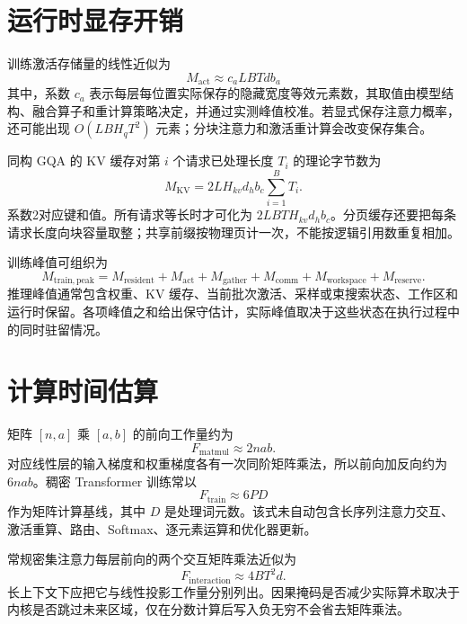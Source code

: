 \documentclass[../textbook.tex]{subfiles}
\begin{document}
\section{运行时显存开销}

训练激活存储量的线性近似为
\begin{equation}
 M_{\mathrm{act}}\approx c_aLBTdb_a
 \label{eq:appendix-activation-memory}
\end{equation}
其中，系数 $c_a$ 表示每层每位置实际保存的隐藏宽度等效元素数，其取值由模型结构、融合算子和重计算策略决定，并通过实测峰值校准。若显式保存注意力概率，还可能出现 $O(LBH_qT^2)$ 元素；分块注意力和激活重计算会改变保存集合。

同构 GQA 的 KV 缓存对第 $i$ 个请求已处理长度 $T_i$ 的理论字节数为
\begin{equation}
 M_{\mathrm{KV}}=2LH_{kv}d_hb_c\sum_{i=1}^{B}T_i.
 \label{eq:appendix-kv-memory}
\end{equation}
系数2对应键和值。所有请求等长时才可化为 $2LBTH_{kv}d_hb_c$。分页缓存还要把每条请求长度向块容量取整；共享前缀按物理页计一次，不能按逻辑引用数重复相加。

训练峰值可组织为
\begin{equation}
 M_{\mathrm{train,peak}}=
 M_{\mathrm{resident}}+M_{\mathrm{act}}+M_{\mathrm{gather}}
 +M_{\mathrm{comm}}+M_{\mathrm{workspace}}+M_{\mathrm{reserve}}.
 \label{eq:appendix-training-peak}
\end{equation}
推理峰值通常包含权重、KV 缓存、当前批次激活、采样或束搜索状态、工作区和运行时保留。各项峰值之和给出保守估计，实际峰值取决于这些状态在执行过程中的同时驻留情况。

\section{计算时间估算}

矩阵 $[n,a]$ 乘 $[a,b]$ 的前向工作量约为
\begin{equation}
 F_{\mathrm{matmul}}\approx2nab.
\end{equation}
对应线性层的输入梯度和权重梯度各有一次同阶矩阵乘法，所以前向加反向约为 $6nab$。稠密 Transformer 训练常以
\begin{equation}
 F_{\mathrm{train}}\approx6PD
 \label{eq:appendix-six-pd}
\end{equation}
作为矩阵计算基线，其中 $D$ 是处理词元数。该式未自动包含长序列注意力交互、激活重算、路由、Softmax、逐元素运算和优化器更新。

常规密集注意力每层前向的两个交互矩阵乘法近似为
\begin{equation}
 F_{\mathrm{interaction}}\approx4BT^2d.
 \label{eq:appendix-attention-flops}
\end{equation}
长上下文下应把它与线性投影工作量分别列出。因果掩码是否减少实际算术取决于内核是否跳过未来区域，仅在分数计算后写入负无穷不会省去矩阵乘法。
\end{document}
